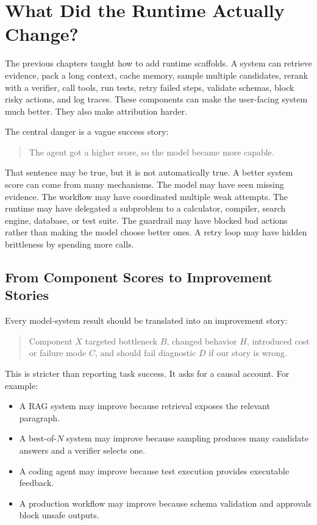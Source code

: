 \section{What Did the Runtime Actually Change?}
\label{sec:ch22-runtime-change}

The previous chapters taught how to add runtime scaffolds. A system can retrieve evidence, pack a long context, cache memory, sample multiple candidates, rerank with a verifier, call tools, run tests, retry failed steps, validate schemas, block risky actions, and log traces. These components can make the user-facing system much better. They also make attribution harder.

The central danger is a vague success story:

\begin{quote}
The agent got a higher score, so the model became more capable.
\end{quote}

That sentence may be true, but it is not automatically true. A better system score can come from many mechanisms. The model may have seen missing evidence. The workflow may have coordinated multiple weak attempts. The runtime may have delegated a subproblem to a calculator, compiler, search engine, database, or test suite. The guardrail may have blocked bad actions rather than making the model choose better ones. A retry loop may have hidden brittleness by spending more calls.

\subsection{From Component Scores to Improvement Stories}

Every model-system result should be translated into an improvement story:

\begin{quote}
Component $X$ targeted bottleneck $B$, changed behavior $H$, introduced cost or failure mode $C$, and should fail diagnostic $D$ if our story is wrong.
\end{quote}

This is stricter than reporting task success. It asks for a causal account. For example:

\begin{itemize}[nosep,leftmargin=1.5em]
  \item A RAG system may improve because retrieval exposes the relevant paragraph.
  \item A best-of-$N$ system may improve because sampling produces many candidate answers and a verifier selects one.
  \item A coding agent may improve because test execution provides executable feedback.
  \item A production workflow may improve because schema validation and approvals block unsafe outputs.
\end{itemize}

